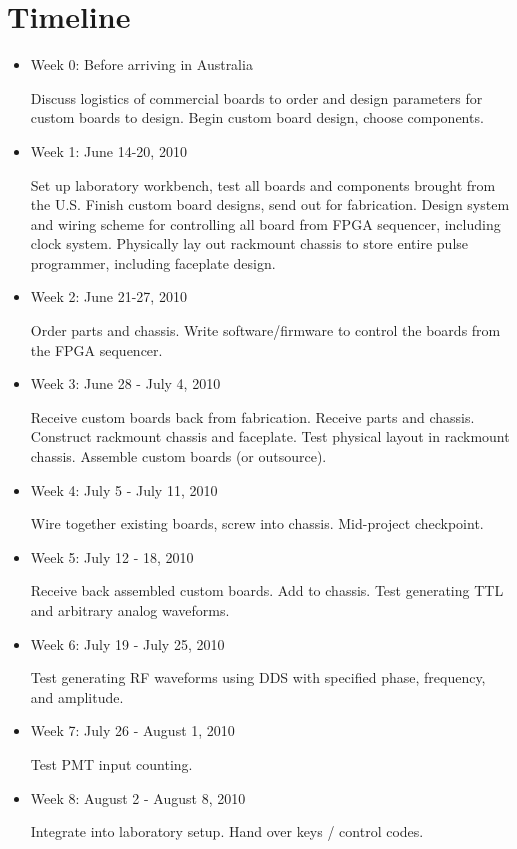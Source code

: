 \documentclass{article}
\begin{document}
\section{Timeline}
\begin{itemize}
\item Week 0: Before arriving in Australia

Discuss logistics of commercial boards to order and design parameters for
custom boards to design.
Begin custom board design, choose components.

\item Week 1: June 14-20, 2010

Set up laboratory workbench, test all boards and components brought from the U.S.
Finish custom board designs, send out for fabrication.
Design system and wiring scheme for controlling all board from FPGA sequencer,
including clock system.
Physically lay out rackmount chassis to store entire pulse programmer,
including faceplate design.

\item Week 2: June 21-27, 2010

Order parts and chassis.
Write software/firmware to control the boards from the FPGA sequencer.

\item Week 3: June 28 - July 4, 2010

Receive custom boards back from fabrication.
Receive parts and chassis.
Construct rackmount chassis and faceplate.
Test physical layout in rackmount chassis.
Assemble custom boards (or outsource).

\item Week 4: July 5 - July 11, 2010

Wire together existing boards, screw into chassis.
Mid-project checkpoint.

\item Week 5: July 12 - 18, 2010

Receive back assembled custom boards. Add to chassis.
Test generating TTL and arbitrary analog waveforms.

\item Week 6: July 19 - July 25, 2010

Test generating RF waveforms using DDS with specified phase, frequency, and
amplitude.

\item Week 7: July 26 - August 1, 2010

Test PMT input counting.

\item Week 8: August 2 - August 8, 2010

Integrate into laboratory setup.
Hand over keys / control codes.

\end{itemize}
\end{document}
